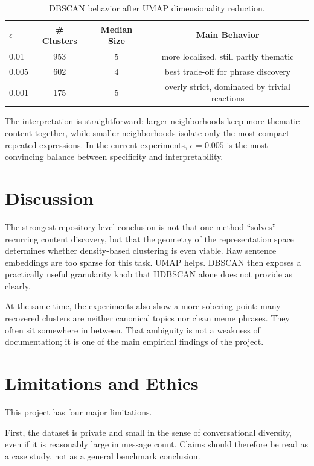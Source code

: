 \documentclass{bmvc2k}
\begin{document}
\begin{table}[h]
\centering
\begin{tabular}{lccc}
\toprule
$\epsilon$ & \# Clusters & Median Size & Main Behavior \\
\midrule
0.01  & 953 & 5 & more localized, still partly thematic \\
0.005 & 602 & 4 & best trade-off for phrase discovery \\
0.001 & 175 & 5 & overly strict, dominated by trivial reactions \\
\bottomrule
\end{tabular}
\caption{DBSCAN behavior after UMAP dimensionality reduction.}
\label{tab:dbscan}
\end{table}

The interpretation is straightforward: larger neighborhoods keep more thematic content together, while smaller neighborhoods isolate only the most compact repeated expressions. In the current experiments, $\epsilon = 0.005$ is the most convincing balance between specificity and interpretability.

\section{Discussion}

The strongest repository-level conclusion is not that one method ``solves'' recurring content discovery, but that the geometry of the representation space determines whether density-based clustering is even viable. Raw sentence embeddings are too sparse for this task. UMAP helps. DBSCAN then exposes a practically useful granularity knob that HDBSCAN alone does not provide as clearly.

At the same time, the experiments also show a more sobering point: many recovered clusters are neither canonical topics nor clean meme phrases. They often sit somewhere in between. That ambiguity is not a weakness of documentation; it is one of the main empirical findings of the project.

\section{Limitations and Ethics}

This project has four major limitations.

First, the dataset is private and small in the sense of conversational diversity, even if it is reasonably large in message count. Claims should therefore be read as a case study, not as a general benchmark conclusion.
\end{document}
